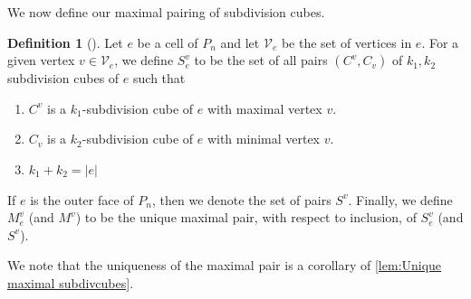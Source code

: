 \documentclass{amsart}
\newcommand{\darkblue}{\color{darkblue}} %
\theoremstyle{definition}
\newtheorem{definition}[theorem]{Definition}
\newcommand{\defn}[1]{\textsl{\darkblue #1}} %
\newcommand{\subdivpairsev}{S_e^v}
\newcommand{\maxsubdivpairsev}{M_e^v}
\newcommand{\subdivpairsv}{S^v}
\newcommand{\maxsubdivpairsv}{M^v}
\begin{document}
We now define our maximal pairing of subdivision cubes.

\begin{definition} [\cite{SaneblidzeUmble-comparingDiagonals}]\label{def:subdiv pairs}
Let $e$ be a cell of $P_n$ and let $\mathcal{V}_e$ be the set of vertices in $e$.
For a given vertex $v \in \mathcal{V}_e$, we define \defn{$\subdivpairsev$} to be the set of all pairs $(C^v,C_v)$ of $k_1,k_2$ subdivision cubes of $e$ such that
\begin{enumerate}
	\item $C^v$ is a $k_1$-subdivision cube of $e$ with maximal vertex $v$.
	\item $C_v$ is a $k_2$-subdivision cube of $e$ with minimal vertex $v$.
	\item $k_1+k_2 = |e|$
\end{enumerate}
If $e$ is the outer face of $P_n$, then we denote the set of pairs \defn{$\subdivpairsv$}.
Finally, we define \defn{$\maxsubdivpairsev$} (and \defn{$\maxsubdivpairsv$}) to be the unique maximal pair, with respect to inclusion, of $\subdivpairsev$ (and $\subdivpairsv$).
\end{definition}
We note that the uniqueness of the maximal pair is a corollary of \cref{lem:Unique maximal subdivcubes}.
\end{document}
